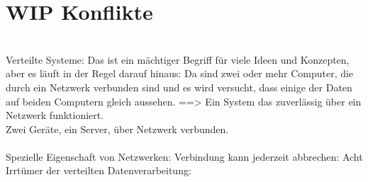 \section{\label{sec:conflict}WIP Konflikte}
\\
Verteilte Systeme: Das ist ein mächtiger Begriff für viele Ideen und Konzepten, aber es läuft in der Regel darauf hinaus: Da sind zwei oder mehr Computer, die durch ein Netzwerk verbunden sind und es wird versucht, dass einige der Daten auf beiden Computern gleich aussehen. ==> Ein System das zuverlässig über ein Netzwerk funktioniert.\\
Zwei Geräte, ein Server, über Netzwerk verbunden.\\\\
Spezielle Eigenschaft von Netzwerken: Verbindung kann jederzeit abbrechen:
Acht Irrtümer der verteilten Datenverarbeitung:
